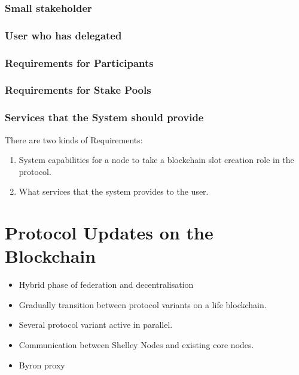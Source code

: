 \documentclass{report}
\theoremstyle{definition}{
  \newtheorem{lemma}{Lemma}[section] %
  \newtheorem{definition}[lemma]{Definition}
}
\theoremstyle{theorem}{
  \newtheorem{invariant}[lemma]{Invariant}
  \newtheorem{proofobligation}[lemma]{Proof Obligation}
}
\numberwithin{equation}{lemma}
\begin{document}
\subsubsection{Small stakeholder}
\subsubsection{User who has delegated}
\subsubsection{Requirements for Participants}
\subsubsection{Requirements for Stake Pools}
\subsubsection{Services that the System should provide}

There are two kinds of Requirements:

\begin{enumerate}
\item System capabilities for a node to take a blockchain slot creation role in the protocol.
\item What services that the system provides to the user.
\end{enumerate}



\section{Protocol Updates on the Blockchain}
\begin{itemize}
\item Hybrid phase of federation and decentralisation
\item Gradually transition between protocol variants on a life blockchain.
\item Several protocol variant active in parallel.
\item Communication between Shelley Nodes and existing core nodes.
\item Byron proxy
\end{itemize}
\end{document}
